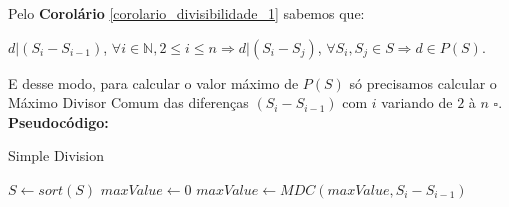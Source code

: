 Pelo \textbf{Corolário} \autoref{corolario_divisibilidade_1} sabemos que:

$d | (S_i-S_{i-1})$, $ \forall i \in \mathbb{N}, 2 \leq i \leq n \Rightarrow d | (S_i-S_j)$, $ \forall S_i, S_j \in S \Rightarrow d \in P(S)$.

E desse modo, para calcular o valor máximo de $P(S)$ só precisamos calcular o Máximo Divisor Comum das diferenças $(S_i-S_{i-1})$ com $i$ variando de $2$ à $n$ $\square$.
\\

\textbf{Pseudocódigo:}
\begin{algorithm}
\caption{Simple Division}\label{euclid}
\begin{algorithmic}[1]
\State $S \gets sort(S)$  
\State $maxValue \gets 0$
\State $maxValue \gets MDC(maxValue, S_i - S_{i-1})$
\EndFor
\State {}
\EndProcedure
\end{algorithmic}
\end{algorithm}


